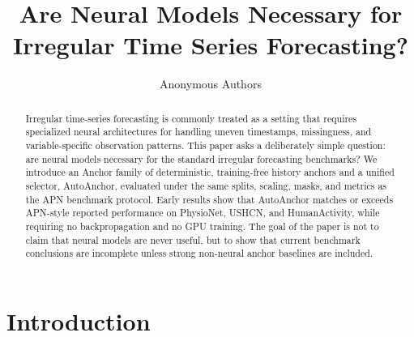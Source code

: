 \documentclass{article}
\title{Are Neural Models Necessary for \\ Irregular Time Series Forecasting?}
\author{Anonymous Authors}
\newcommand{\method}{AutoAnchor}
\newcommand{\family}{Anchor family}
\begin{document}
\maketitle

\begin{abstract}
Irregular time-series forecasting is commonly treated as a setting that requires
specialized neural architectures for handling uneven timestamps, missingness,
and variable-specific observation patterns. This paper asks a deliberately
simple question: are neural models necessary for the standard irregular
forecasting benchmarks? We introduce an \family{} of deterministic, training-free
history anchors and a unified selector, \method{}, evaluated under the same
splits, scaling, masks, and metrics as the APN benchmark protocol. Early results
show that \method{} matches or exceeds APN-style reported performance on
PhysioNet, USHCN, and HumanActivity, while requiring no backpropagation and no
GPU training. The goal of the paper is not to claim that neural models are never
useful, but to show that current benchmark conclusions are incomplete unless
strong non-neural anchor baselines are included.
\end{abstract}

\section{Introduction}
\end{document}
